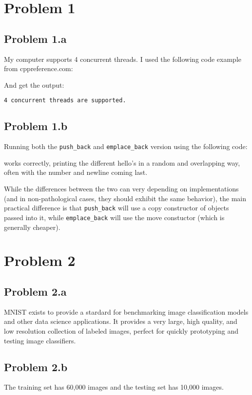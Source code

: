\documentclass[12pt,letterpaper]{article}
\let\cc\lstinline
\begin{document}
\section{Problem 1}

\subsection{Problem 1.a}

My computer supports 4 concurrent threads. I used the following code example from cppreference.com:



And get the output:

\lstinline{4 concurrent threads are supported.}

\subsection{Problem 1.b}

Running both the \cc{push_back} and \cc{emplace_back} version using the following code:



works correctly, printing the different hello's in a random and overlapping way, often with the
number and newline coming last. 

While the differences between the two can very depending on implementations (and in non-pathological
cases, they should exhibit the same behavior), the main practical difference is that \cc{push_back}
will use a copy constructor of objects passed into it, while \cc{emplace_back} will use the move
constuctor (which is generally cheaper).

\section{Problem 2}

\subsection{Problem 2.a}

MNIST exists to provide a stardard for benchmarking image classification models and other data
science applications. It provides a very large, high quality, and low resolution collection of
labeled images, perfect for quickly prototyping and testing image classifiers.

\subsection{Problem 2.b}

The training set has 60,000 images and the testing set has 10,000 images.
\end{document}
